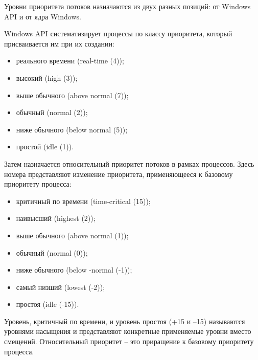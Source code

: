 \documentclass[a4paper, 12pt]{extreport}
\begin{document}
Уровни приоритета потоков назначаются из двух разных позиций: от Windows API и от ядра Windows.

Windows API систематизирует процессы по классу приоритета, который присваивается им при их создании:
\begin{itemize}
	\item реального времени (real-time (4));
	\item высокий (high (3));
	\item выше обычного (above normal (7));
	\item обычный (normal (2));
	\item ниже обычного (below normal (5));
	\item простой (idle (1)).
\end{itemize}

Затем назначается относительный приоритет потоков в рамках процессов. Здесь номера представляют изменение приоритета, 
применяющееся к базовому приоритету процесса:
\begin{itemize}
	\item критичный по времени (time-critical (15));
	\item наивысший (highest (2));
	\item выше обычного (above normal (1));
	\item обычный (normal (0));
	\item ниже обычного (below -normal (-1));
	\item самый низший (lowest (-2));
	\item простоя (idle (-15)).
\end{itemize}

Уровень, критичный по времени, и уровень простоя (+15 и –15) называются уровнями насыщения и представляют конкретные 
применяемые уровни вместо смещений. Относительный приоритет -- это приращение к базовому приоритету процесса.
\end{document}
